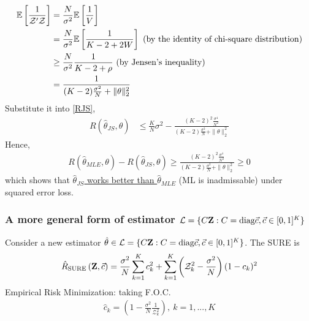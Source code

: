 \documentclass[11pt]{elegantbook}
\begin{document}
\begin{equation}
    \begin{aligned}
        \mathbb{E}\left[\frac{1}{\mathcal{Z}'\mathcal{Z}}\right]&=\frac{N}{\sigma^2}\mathbb{E}\left[\frac{1}{V}\right]\\
        &=\frac{N}{\sigma^2}\mathbb{E}\left[\frac{1}{K-2+2W}\right] \textnormal{ (by the identity of chi-square distribution)}\\
        &\geq \frac{N}{\sigma^2}\frac{1}{K-2+\rho} \textnormal{ (by Jensen's inequality)}\\
        &=\frac{1}{(K-2)\frac{\sigma^2}{N}+\|\theta\|_2^2}
    \end{aligned}
    \nonumber
\end{equation}
Substitute it into \ref{RJS},
\begin{equation}
    \begin{aligned}
        R(\hat{\theta}_{JS},\theta)&\leq \frac{K}{N}\sigma^2-\frac{(K-2)^2\frac{\sigma^4}{N^2}}{(K-2)\frac{\sigma^2}{N}+\|\theta\|_2^2}
    \end{aligned}
    \nonumber
\end{equation}
Hence,
\begin{equation}
    \begin{aligned}
        R(\hat{\theta}_{MLE},\theta)-R(\hat{\theta}_{JS},\theta)\geq \frac{(K-2)^2\frac{\sigma^4}{N^2}}{(K-2)\frac{\sigma^2}{N}+\|\theta\|_2^2}\geq 0
    \end{aligned}
    \nonumber
\end{equation}
which shows that \underline{$\hat{\theta}_{JS}$ works better than $\hat{\theta}_{MLE}$} (ML is inadmissable) under squared error loss.


\subsubsection{A more general form of estimator $\mathcal{L}=\{C \mathbf{Z}:C=\textnormal{diag}\vec{c},\vec{c}\in[0,1]^K\}$}
Consider a new estimator $\hat{\theta}\in \mathcal{L}=\{C \mathbf{Z}:C=\textnormal{diag}\vec{c},\vec{c}\in[0,1]^K\}$. The SURE is
\begin{equation}
    \begin{aligned}
        \hat{R}_\textnormal{SURE}\left(\mathbf{Z},\vec{c}\right)=\frac{\sigma^2}{N}\sum_{k=1}^K c_k^2+\sum_{k=1}^K\left(\mathcal{Z}_k^2-\frac{\sigma^2}{N}\right)(1-c_k)^2
    \end{aligned}
    \nonumber
\end{equation}
Empirical Risk Minimization: taking F.O.C.
\begin{equation}
    \begin{aligned}
        \hat{c}_k=\left(1-\frac{\sigma^2}{N}\frac{1}{\mathcal{Z}_k^2}\right),\ k=1,...,K
    \end{aligned}
    \nonumber
\end{equation}
\end{document}
